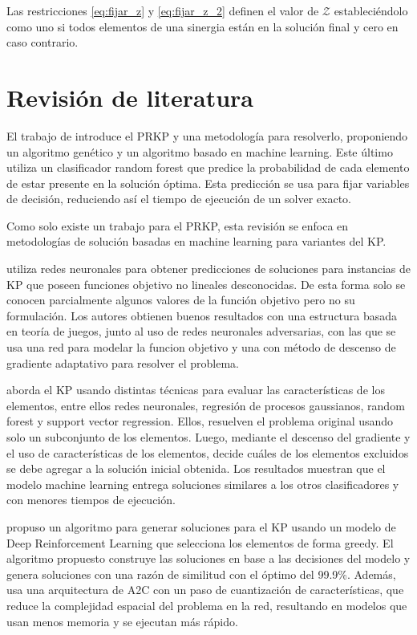 \documentclass[spanish, a4paper, 12pt, openany,final]{book}
\begin{document}
    Las restricciones \eqref{eq:fijar_z} y \eqref{eq:fijar_z_2} definen el valor de $\mathcal{Z}$ estableciéndolo como uno si todos elementos de una sinergia están en la solución final y cero en caso contrario.
  
\section{Revisión de literatura}


El trabajo de \cite{baldo_polynomial_2023} introduce el PRKP y una metodología para resolverlo, proponiendo un algoritmo genético y un algoritmo basado en machine learning. Este último utiliza un clasificador random forest que predice la probabilidad de cada elemento de estar presente en la solución óptima. Esta predicción se usa para fijar variables de decisión, reduciendo así el tiempo de ejecución de un solver exacto.

Como solo existe un trabajo para el PRKP, esta revisión se enfoca en metodologías de solución basadas en machine learning para variantes del KP.

\cite{li_novel_2021} utiliza redes neuronales para obtener predicciones de soluciones para instancias de KP que poseen funciones objetivo no lineales desconocidas. De esta forma solo se conocen parcialmente algunos valores de la función objetivo pero no su formulación. Los autores obtienen buenos resultados con una estructura basada en teoría de juegos, junto al uso de redes neuronales adversarias, con las que se usa una red para modelar la funcion objetivo y una con método de descenso de gradiente adaptativo para resolver el problema.

\cite{rezoug_application_2022} aborda el KP usando distintas técnicas para evaluar las características de los elementos, entre ellos redes neuronales, regresión de procesos gaussianos, random forest y support vector regression. Ellos, resuelven el problema original usando solo un subconjunto de los elementos. Luego, mediante el descenso del gradiente y el uso de características de los elementos, decide cuáles de los elementos excluidos se debe agregar a la solución inicial obtenida. Los resultados muestran que el modelo machine learning entrega soluciones similares a los otros clasificadores y con menores tiempos de ejecución.

\cite{afshar_state_2020} propuso un algoritmo para generar soluciones para el KP usando un modelo de Deep Reinforcement Learning que selecciona los elementos de forma greedy. El algoritmo propuesto construye las soluciones en base a las decisiones del modelo y genera soluciones con una razón de similitud con el óptimo del 99.9\%. Además, usa una arquitectura de A2C con un paso de cuantización de características, que reduce la complejidad espacial del problema en la red, resultando en modelos que usan menos memoria y se ejecutan más rápido.
\end{document}

